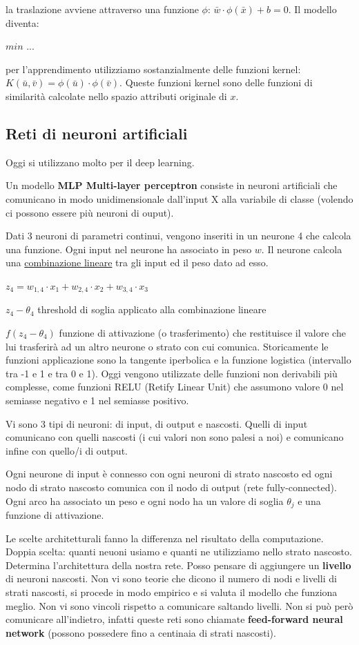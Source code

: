la traslazione avviene attraverso una funzione $\phi$: $\bar{w} \cdot \phi(\bar{x}) + b = 0$. Il modello diventa:

$ min $ ...

per l'apprendimento utilizziamo sostanzialmente delle funzioni kernel: $K(\bar{u}, \bar{v}) = \phi(\bar{u}) \cdot \phi(\bar{v})$. Queste funzioni kernel sono delle funzioni di similarit\`a calcolate nello spazio attributi originale di $x$.

\subsection{Reti di neuroni artificiali}
Oggi si utilizzano molto per il deep learning.

Un modello \textbf{MLP Multi-layer perceptron} consiste in neuroni artificiali che comunicano in modo unidimensionale dall'input X alla variabile di classe (volendo ci possono essere pi\`u neuroni di ouput).

Dati 3 neuroni di parametri continui, vengono inseriti in un neurone 4 che calcola una funzione. Ogni input nel neurone ha associato in peso $w$.
Il neurone calcola una \underline{combinazione lineare} tra gli input ed il peso dato ad esso. 

$z_4 = w_{1,4} \cdot x_1 + w_{2,4} \cdot x_2 +w_{3,4} \cdot x_3$

$z_4 - \theta_4$ threshold di soglia applicato alla combinazione lineare

$f(z_4 - \theta_4)$ funzione di attivazione (o trasferimento) che restituisce il valore che lui trasferir\`a ad un altro neurone o strato con cui comunica. Storicamente le funzioni applicazione sono la tangente iperbolica e la funzione logistica (intervallo tra -1 e 1 e tra 0 e 1). Oggi vengono utilizzate delle funzioni non derivabili pi\`u complesse, come funzioni RELU (Retify Linear Unit) che assumono valore 0 nel semiasse negativo e 1 nel semiasse positivo.

Vi sono 3 tipi di neuroni: di input, di output e nascosti. Quelli di input comunicano con quelli nascosti (i cui valori non sono palesi a noi) e comunicano infine con quello/i di output. 

Ogni neurone di input \`e connesso con ogni neuroni di strato nascosto  ed ogni nodo di strato nascosto comunica con il nodo di output (rete fully-connected). Ogni arco ha associato un peso e ogni nodo ha un valore di soglia $\theta_j$ e una funzione di attivazione. 

Le scelte architetturali fanno la differenza nel risultato della computazione. Doppia scelta: quanti neuoni usiamo e quanti ne utilizziamo nello strato nascosto. Determina l'architettura della nostra rete. Posso pensare di aggiungere un \textbf{livello} di neuroni nascosti. Non vi sono teorie che dicono il numero di nodi e livelli di strati nascosti, si procede in modo empirico e si valuta il modello che funziona meglio. Non vi sono vincoli rispetto a comunicare saltando livelli. Non si pu\`o per\`o comunicare all'indietro, infatti queste reti sono chiamate \textbf{feed-forward neural network} (possono possedere fino a centinaia di strati nascosti).

